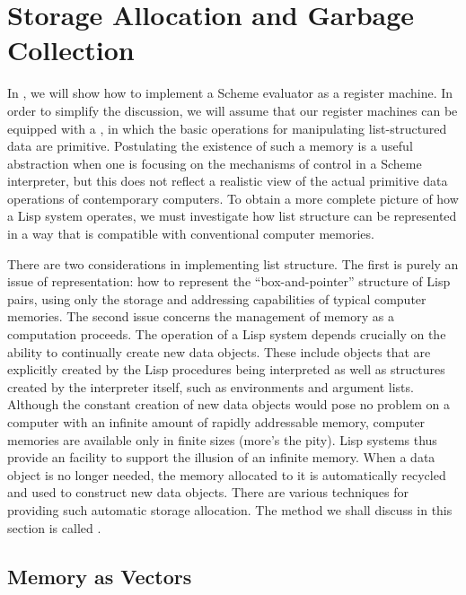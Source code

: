 \section{Storage Allocation and Garbage Collection}
\label{Section 5.3}

In , we will show how to implement a Scheme evaluator as a register machine.
In order to simplify the discussion, we will assume that our register machines can be equipped with a , in which the basic operations for manipulating list-structured data are primitive.
Postulating the existence of such a memory is a useful abstraction when one is focusing on the mechanisms of control in a Scheme interpreter, but this does not reflect a realistic view of the actual primitive data operations of contemporary computers.
To obtain a more complete picture of how a Lisp system operates, we must investigate how list structure can be represented in a way that is compatible with conventional computer memories.

There are two considerations in implementing list structure.
The first is purely an issue of representation:
how to represent the “box-and-pointer” structure of Lisp pairs, using only the storage and addressing capabilities of typical computer memories.
The second issue concerns the management of memory as a computation proceeds.
The operation of a Lisp system depends crucially on the ability to continually create new data objects.
These include objects that are explicitly created by the Lisp procedures being interpreted as well as structures created by the interpreter itself, such as environments and argument lists.
Although the constant creation of new data objects would pose no problem on a computer with an infinite amount of rapidly addressable memory, computer memories are available only in finite sizes (more’s the pity).
Lisp systems thus provide an  facility to support the illusion of an infinite memory.
When a data object is no longer needed, the memory allocated to it is automatically recycled and used to construct new data objects.
There are various techniques for providing such automatic storage allocation.
The method we shall discuss in this section is called .



\subsection{Memory as Vectors}
\label{Section 5.3.1}

